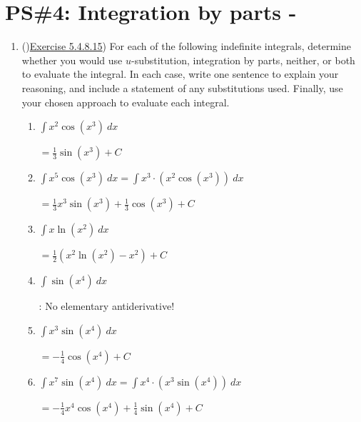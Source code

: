 


%


\allowdisplaybreaks
\section{PS\#4: Integration by parts -  }

\everymath{\displaystyle}
\begin{enumerate}[leftmargin=0pt]

\item ()\href{https://activecalculus.org/single/sec-5-4-parts.html#ez-5-4-15}{Exercise 5.4.8.15})
For each of the following indefinite integrals, determine whether you would use 
$u$-substitution, integration by parts, neither, or both to evaluate the integral. In each case, write one sentence to explain your reasoning, and include a statement of any substitutions used. Finally, use your chosen approach to evaluate each integral.
\begin{enumerate}
    \item $\int x^2 \cos(x^3)\ dx$ \begin{red}
        $= \frac13 \sin(x^3) +C$
    \end{red}
    
    \item $\int x^5 \cos(x^3)\ dx = \int x^3\cdot (x^2\cos(x^3))\ dx$
    \begin{red}
        $= \frac13 x^3 \sin(x^3) + \frac13 \cos(x^3) + C$
    \end{red}
    
    \item $\int x\ln(x^2)\ dx$
    \begin{red}
        $= \frac12\left(x^2 \ln(x^2) - x^2\right) + C$
    \end{red}
    
    \item $\int \sin(x^4)\ dx$
    \begin{red}
        : No elementary antiderivative!
    \end{red}
    
    
    \item $\int x^3\sin(x^4)\ dx$
    \begin{red}
        $=-\frac14\cos(x^4)+ C$
    \end{red}
    
    \item $\int x^7 \sin(x^4)\ dx = \int x^4\cdot (x^3\sin(x^4))\ dx$
    \begin{red}
        $=-\frac14 x^4\cos(x^4) + \frac14 \sin(x^4) + C$
    \end{red}
    
\end{enumerate}
\end{enumerate}
